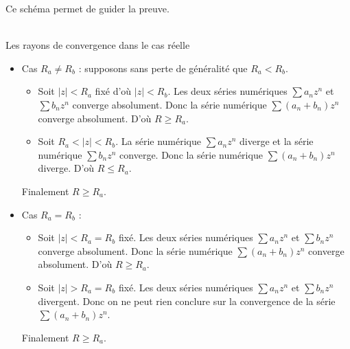 \documentclass{book}
\begin{document}
\begin{Demonstration}[1.]

Ce schéma permet de guider la preuve.\\
\begin{center}
\\
Les rayons de convergence dans le cas réelle
\end{center}
\begin{itemize}
\item Cas $R_a \neq R_b$ : supposons sans perte de généralité que $R_a < R_b$.\\
\begin{itemize}
\item Soit $|z | < R_a$ fixé d'où $|z | < R_b$. Les deux séries numériques $\sum a_n z^n$ et $\sum b_n z^n$ converge absolument. Donc la série numérique  $\sum(a_n+b_n)z^n$ converge absolument. D'où $R\geq R_a$.
\item  Soit $R_a<|z | <R_b $. La série numérique $\sum a_n z^n$ diverge et la série numérique $\sum b_n z^n$ converge. Donc la série numérique  $\sum(a_n+b_n)z^n$ diverge. D'où $R\leq R_a$.
\end{itemize}
Finalement $R\geq R_a$.
\item Cas $R_a = R_b$ :
\begin{itemize}
\item Soit $|z | < R_a=R_b$ fixé. Les deux séries numériques $\sum a_n z^n$ et $\sum b_n z^n$ converge absolument. Donc la série numérique  $\sum(a_n+b_n)z^n$ converge absolument. D'où $R\geq R_a$.
\item  Soit $|z | > R_a=R_b$ fixé. Les deux séries numériques $\sum a_n z^n$ et $\sum b_n z^n$ divergent. Donc on ne peut rien conclure sur la convergence de la série  $\sum(a_n+b_n)z^n$. 
\end{itemize}
Finalement $R\geq R_a$.
\end{itemize}
\end{Demonstration}
\end{document}
